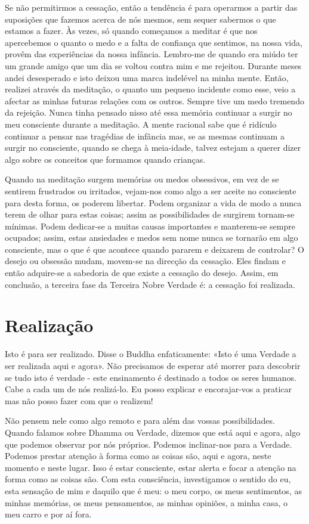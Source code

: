 Se não permitirmos a cessação, então a tendência é para operarmos a partir das
suposições que fazemos acerca de nós mesmos, sem sequer sabermos o que estamos a
fazer. Às vezes, só quando começamos a meditar é que nos apercebemos o quanto o
medo e a falta de confiança que sentimos, na nossa vida, provêm das experiências
da nossa infância. Lembro-me de quando era miúdo ter um grande amigo que um dia
se voltou contra mim e me rejeitou. Durante meses andei desesperado e isto
deixou uma marca indelével na minha mente. Então, realizei através da meditação,
o quanto um pequeno incidente como esse, veio a afectar as minhas futuras
relações com os outros. Sempre tive um medo tremendo da rejeição. Nunca tinha
pensado nisso até essa memória continuar a surgir no meu consciente durante a
meditação. A mente racional sabe que é ridículo continuar a pensar nas tragédias
de infância mas, se as mesmas continuam a surgir no consciente, quando se chega
à meia-idade, talvez estejam a querer dizer algo sobre os conceitos que formamos
quando crianças.

Quando na meditação surgem memórias ou medos obsessivos, em vez de se sentirem
frustrados ou irritados, vejam-nos como algo a ser aceite no consciente para
desta forma, os poderem libertar. Podem organizar a vida de modo a nunca terem
de olhar para estas coisas; assim as possibilidades de surgirem tornam-se
mínimas. Podem dedicar-se a muitas causas importantes e manterem-se sempre
ocupados; assim, estas ansiedades e medos sem nome nunca se tornarão em algo
consciente, mas o que é que acontece quando pararem e deixarem de controlar? O
desejo ou obsessão mudam, movem-se na direcção da cessação. Eles findam e então
adquire-se a sabedoria de que existe a cessação do desejo. Assim, em conclusão,
a terceira fase da Terceira Nobre Verdade é: a cessação foi realizada.

\section{Realização}

Isto é para ser realizado. Disse o Buddha enfaticamente: «Isto é uma Verdade a
ser realizada aqui e agora». Não precisamos de esperar até morrer para descobrir
se tudo isto é verdade - este ensinamento é destinado a todos os seres humanos.
Cabe a cada um de nós realizá-lo. Eu posso explicar e encorajar-vos a praticar
mas não posso fazer com que o realizem!

Não pensem nele como algo remoto e para além das vossas possibilidades. Quando
falamos sobre Dhamma ou Verdade, dizemos que está aqui e agora, algo que podemos
observar por nós próprios. Podemos inclinar-nos para a Verdade. Podemos prestar
atenção à forma como as coisas são, aqui e agora, neste momento e neste lugar.
Isso é estar consciente, estar alerta e focar a atenção na forma como as coisas
são. Com esta consciência, investigamos o sentido do eu, esta sensação de mim
e daquilo que é meu: o meu corpo, os meus sentimentos, as minhas memórias, os
meus pensamentos, as minhas opiniões, a minha casa, o meu carro e por aí fora.

